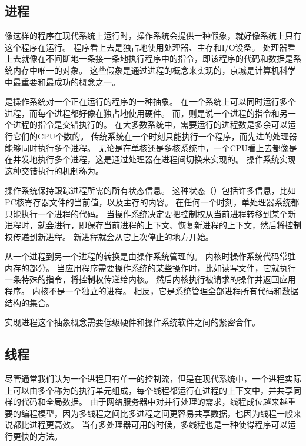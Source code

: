 {    \subsection{进程}
    {
        像这样的程序在现代系统上运行时，操作系统会提供一种假象，就好像系统上只有这个程序在运行。
        程序看上去是独占地使用处理器、主存和I/O设备。
        处理器看上去就像在不间断地一条接一条地执行程序中的指令，即该程序的代码和数据是系统内存中唯一的对象。
        这些假象是通过进程的概念来实现的，京城是计算机科学中最重要和最成功的概念之一。

        是操作系统对一个正在运行的程序的一种抽象。
        在一个系统上可以同时运行多个进程，而每个进程都好像在独占地使用硬件。
        而，则是说一个进程的指令和另一个进程的指令是交错执行的。
        在大多数系统中，需要运行的进程数是多余可以运行它们的CPU个数的。
        传统系统在一个时刻只能执行一个程序，而先进的处理器能够同时执行多个进程。
        无论是在单核还是多核系统中，一个CPU看上去都像是在并发地执行多个进程，这是通过处理器在进程间切换来实现的。
        操作系统实现这种交错执行的机制称为。

        操作系统保持跟踪进程所需的所有状态信息。
        这种状态（）包括许多信息，比如PC核寄存器文件的当前值，以及主存的内容。
        在任何一个时刻，单处理器系统都只能执行一个进程的代码。
        当操作系统决定要把控制权从当前进程转移到某个新进程时，就会进行，即保存当前进程的上下文、恢复新进程的上下文，然后将控制权传递到新进程。
        新进程就会从它上次停止的地方开始。

        从一个进程到另一个进程的转换是由操作系统管理的。
        内核时操作系统代码常驻内存的部分。
        当应用程序需要操作系统的某些操作时，比如读写文件，它就执行一条特殊的指令，将控制权传递给内核。
        然后内核执行被请求的操作并返回应用程序。
        内核不是一个独立的进程。
        相反，它是系统管理全部进程所有代码和数据结构的集合。

        实现进程这个抽象概念需要低级硬件和操作系统软件之间的紧密合作。
    }

    \subsection{线程}
    {
        尽管通常我们认为一个进程只有单一的控制流，但是在现代系统中，一个进程实际上可以由多个称为的执行单元组成，每个线程都运行在进程的上下文中，并共享同样的代码和全局数据。
        由于网络服务器中对并行处理的需求，线程成位越来越重要的编程模型，因为多线程之间比多进程之间更容易共享数据，也因为线程一般来说都比进程更高效。
        当有多处理器可用的时候，多线程也是一种使得程序可以运行更快的方法。
    }

}
